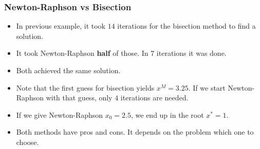 \documentclass[11pt,xcolor={svgnames},aspectratio=169,usepdftitle=false,notheorems]{beamer}
\begin{document}
\begin{frame}
  \frametitle{Newton-Raphson vs Bisection}
\begin{itemize}
  \item In previous example, it took $14$ iterations for the bisection method to find a solution.
  \item It took Newton-Raphson \alert{\textbf{half}} of those. In $7$ iterations it was done.
  \item Both achieved the same solution.
  \item Note that the first guess for bisection yields $x^M = 3.25$. If we start Newton-Raphson with that guess, only $4$ iterations are needed.
  \item If we give Newton-Raphson $x_0 = 2.5$, we end up in the root $x^* = 1$.
  \item Both methods have pros and cons. It depends on the problem which one to choose.
\end{itemize}
\end{frame}
\end{document}
